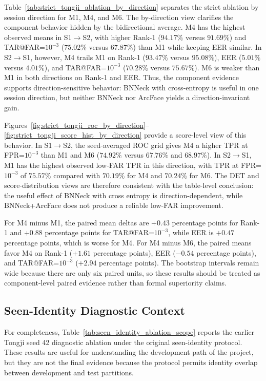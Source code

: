 Table~\ref{tab:strict_tongji_ablation_by_direction} separates the strict ablation by session direction for M1, M4, and M6. The by-direction view clarifies the component behavior hidden by the bidirectional average. M4 has the highest observed means in S1$\rightarrow$S2, with higher Rank-1 ($94.17\%$ versus $91.69\%$) and TAR@FAR=$10^{-3}$ ($75.02\%$ versus $67.87\%$) than M1 while keeping EER similar. In S2$\rightarrow$S1, however, M4 trails M1 on Rank-1 ($93.47\%$ versus $95.08\%$), EER ($5.01\%$ versus $4.01\%$), and TAR@FAR=$10^{-3}$ ($70.28\%$ versus $75.67\%$). M6 is weaker than M1 in both directions on Rank-1 and EER. Thus, the component evidence supports direction-sensitive behavior: BNNeck with cross-entropy is useful in one session direction, but neither BNNeck nor ArcFace yields a direction-invariant gain.

Figures~\ref{fig:strict_tongji_roc_by_direction}--\ref{fig:strict_tongji_score_hist_by_direction} provide a score-level view of this behavior. In S1$\rightarrow$S2, the seed-averaged ROC grid gives M4 a higher TPR at FPR=$10^{-3}$ than M1 and M6 ($74.92\%$ versus $67.76\%$ and $68.97\%$). In S2$\rightarrow$S1, M1 has the highest observed low-FAR TPR in this direction, with TPR at FPR=$10^{-3}$ of $75.57\%$ compared with $70.19\%$ for M4 and $70.24\%$ for M6. The DET and score-distribution views are therefore consistent with the table-level conclusion: the useful effect of BNNeck with cross entropy is direction-dependent, while BNNeck+ArcFace does not produce a reliable low-FAR improvement.

For M4 minus M1, the paired mean deltas are $+0.43$ percentage points for Rank-1 and $+0.88$ percentage points for TAR@FAR=$10^{-3}$, while EER is $+0.47$ percentage points, which is worse for M4. For M4 minus M6, the paired means favor M4 on Rank-1 ($+1.61$ percentage points), EER ($-0.54$ percentage points), and TAR@FAR=$10^{-3}$ ($+2.94$ percentage points). The bootstrap intervals remain wide because there are only six paired units, so these results should be treated as component-level paired evidence rather than formal superiority claims.

\subsection{Seen-Identity Diagnostic Context}

For completeness, Table~\ref{tab:seen_identity_ablation_scope} reports the earlier Tongji seed 42 diagnostic ablation under the original seen-identity protocol. These results are useful for understanding the development path of the project, but they are not the final evidence because the protocol permits identity overlap between development and test partitions.

